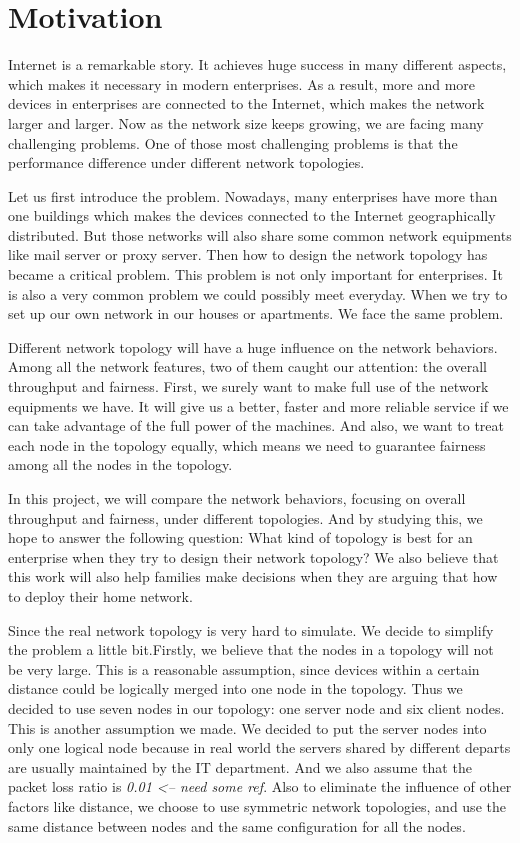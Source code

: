 \section{Motivation} \label{sec:motivation}

Internet is a remarkable story. It achieves huge success in many different aspects, which makes it necessary in modern enterprises.
As a result, more and more devices in enterprises are connected to the Internet, which makes the network larger and larger. Now as the network size keeps growing, we are facing many challenging problems.
One of those most challenging problems is that the performance difference under different network topologies.

Let us first introduce the problem.
Nowadays, many enterprises have more than one buildings which makes the devices connected to the Internet geographically distributed. But those networks will also share some common network equipments like mail server or proxy server. Then how to design the network topology has became a critical problem. This problem is not only important for enterprises. It is also a very common problem we could possibly meet everyday. When we try to set up our own network in our houses or apartments. We face the same problem.

Different network topology will have a huge influence on the network behaviors. Among all the network features, two of them caught our attention: the overall throughput and fairness. First, we surely want to make full use of the network equipments we have. It will give us a better, faster and more reliable service if we can take advantage of the full power of the machines. And also, we want to treat each node in the topology equally, which means we need to guarantee fairness among all the nodes in the topology.
 
In this project, we will compare the network behaviors, focusing on overall throughput and fairness, under different topologies. And by studying this, we hope to answer the following question: What kind of topology is best for an enterprise when they try to design their network topology? We also believe that this work will also help families make decisions when they are arguing that how to deploy their home network.

Since the real network topology is very hard to simulate. We decide to simplify the problem a little bit.Firstly, we believe that the nodes in a topology will not be very large. This is a reasonable assumption, since devices within a certain distance could be logically merged into one node in the topology. Thus we decided to use seven nodes in our topology: one server node and six client nodes. This is another assumption we made. We decided to put the server nodes into only one logical node because in real world the servers shared by different departs are usually maintained by the IT department. And we also assume that the packet loss ratio is \textit{0.01 <-- need some ref}. Also to eliminate the influence of other factors like distance, we choose to use symmetric network topologies, and use the same distance between nodes and the same configuration for all the nodes.
